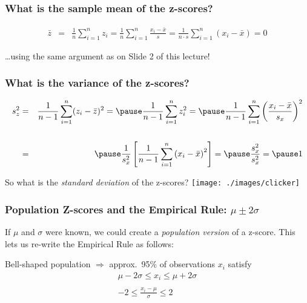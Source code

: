 \begin{frame}
\frametitle{What is the sample mean of the z-scores?}
\begin{eqnarray*}
\bar{z} &=& \frac{1}{n}\sum_{i=1}^n z_i = \frac{1}{n} \sum_{i=1}^n \frac{x_i - \bar{x}}{s}= \frac{1}{n\cdot s} \sum_{i=1}^n (x_i - \bar{x}) = 0
\end{eqnarray*}

\alert{\dots using the same argument as on Slide 2 of this lecture!}
\end{frame}



\begin{frame}
\frametitle{What is the variance of the z-scores?}
\begin{eqnarray*}
	s^2_z &=& \frac{1}{n-1}\sum_{i=1}^n (z_i - \bar{z})^2 =\pause \frac{1}{n-1}\sum_{i=1}^n z_i^2 = \pause \frac{1}{n-1} \sum_{i=1}^n \left(\frac{x_i - \bar{x}}{s_x}\right)^2\\\\
	&=& \pause \frac{1}{s_x^2} \left[ \frac{1}{n-1} \sum_{i=1}^n \left(x_i - \bar{x}\right)^2 \right] = \pause \frac{s_x^2}{s_x^2} = \pause 1
	\end{eqnarray*}
	
	\pause
	\vspace{5em}
	\alert{So what is the \emph{standard deviation} of the z-scores? \hfill \texttt{[image: ./images/clicker]} }
\end{frame}




\begin{frame}
\frametitle{Population Z-scores and the Empirical Rule: $\mu \pm 2\sigma$}
If $\mu$ and $\sigma$ were known, we could create a \alert{\emph{population version}} of a z-score. This lets us re-write the Empirical Rule as follows:

\pause
\vspace{2em}
\alert{Bell-shaped population $\Rightarrow$ approx.\ 95\% of observations $x_i$ satisfy}
\begin{eqnarray*}
\mu - 2\sigma \leq x_i \leq \mu + 2\sigma\\ \\
-2 \leq \frac{x_i - \mu}{\sigma} \leq 2
\end{eqnarray*}


\end{frame}
